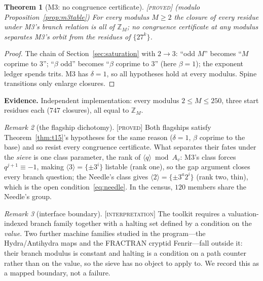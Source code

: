 \documentclass[11pt]{article}
\newtheorem{theorem}{Theorem}[section]
\theoremstyle{definition}
\theoremstyle{remark}
\newtheorem{remark}[theorem]{Remark}
\newenvironment{evidence}
  {\par\smallskip\noindent\footnotesize\textbf{Evidence.}}
  {\par\smallskip}
\newcommand{\Z}{\mathbb{Z}}
\newcommand{\Proved}{\textsc{[proved]}}
\newcommand{\Interp}{\textsc{[interpretation]}}
\begin{document}
\begin{theorem}[M3: no congruence certificate]\label{thm:m3n1}
\Proved{} (modulo Proposition~\ref{prop:m3table})\; For every modulus $M\ge2$
the closure of every residue under M3's branch relation is all of $\Z_M$; no
congruence certificate at any modulus separates M3's orbit from the residues of
$\{27^{k}\}$.
\end{theorem}

\begin{proof}
The chain of Section~\ref{sec:saturation} with $2\to3$: ``odd $M$'' becomes
``$M$ coprime to $3$''; ``$\beta$ odd'' becomes ``$\beta$ coprime to $3$''
(here $\beta=1$); the exponent ledger spends trits.  M3 has $\delta=1$, so all
hypotheses hold at every modulus.  Spine transitions only enlarge closures.
\end{proof}

\begin{evidence}
Independent implementation: every modulus $2\le M\le250$, three start residues
each ($747$ closures), all equal to $\Z_M$.
\end{evidence}

\begin{remark}[the flagship dichotomy]\label{rem:rank}
\Proved{}\; Both flagships satisfy Theorem~\ref{thm:t15}'s hypotheses for the
same reason ($\delta=1$, $\beta$ coprime to the base) and so resist every
congruence certificate.  What separates their fates under the \emph{sieve} is
one class parameter, the rank of $\langle q\rangle\bmod A_v$: M3's class forces
$q^{j+1}\equiv-1$, making $\langle3\rangle=\{\pm3^{i}\}$ listable (rank one), so
the gap argument closes every branch question; the Needle's class gives
$\langle2\rangle=\{\pm3^{a}2^{i}\}$ (rank two, thin), which is the open
condition~\eqref{eq:needle}.  In the census, $120$ members share the Needle's
group.
\end{remark}

\begin{remark}[interface boundary]\label{rem:boundary}
\Interp{}\; The toolkit requires a valuation-indexed branch family together
with a halting set defined by a condition on the \emph{value}.  Two further
machine families studied in the program---the Hydra/Antihydra maps and the
FRACTRAN cryptid Fenrir---fall outside it: their branch modulus is constant and
halting is a condition on a path counter rather than on the value, so the sieve
has no object to apply to.  We record this as a mapped boundary, not a failure.
\end{remark}
\end{document}
